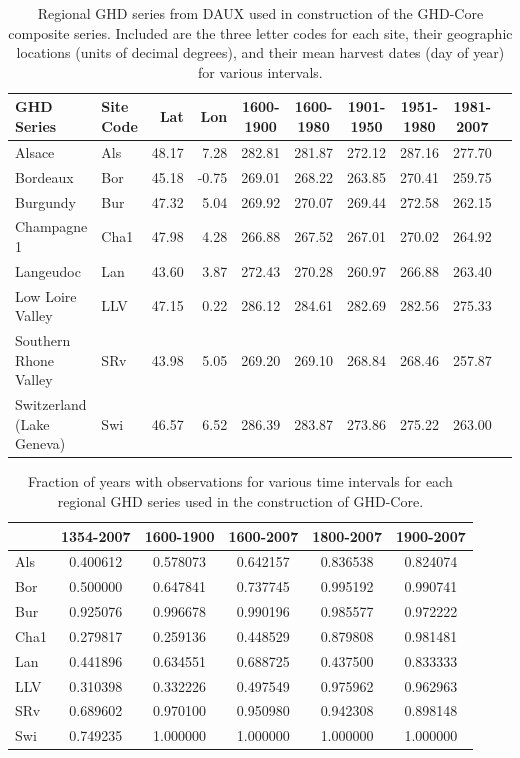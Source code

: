 \documentclass[12pt]{article}
\begin{document}
\begin{table}
\small
\caption{\small Regional GHD series from DAUX used in construction of the GHD-Core composite series. Included are the three letter codes for each site, their geographic locations (units of decimal degrees), and their mean harvest dates (day of year) for various intervals.}
\centering
\begin{tabular}{| l l | r r | c c c c c p{5cm} |}
\hline
 \bf GHD Series & \bf Site Code & \bf Lat & \bf Lon & \bf 1600-1900 & \bf 1600-1980 & \bf 1901-1950 & \bf 1951-1980 & \bf 1981-2007 \\
\hline
Alsace	& Als & 48.17 & 7.28 & 282.81 & 281.87 & 272.12 & 287.16	 & 277.70 \\
Bordeaux	& Bor	& 45.18 & -0.75	& 269.01 & 	268.22	&  263.85 &  270.41 &  259.75\\
Burgundy	& Bur	& 47.32	& 5.04	& 269.92	& 270.07	& 269.44	& 272.58	& 262.15\\
Champagne 1	& Cha1	& 47.98	& 4.28	& 266.88	& 267.52	& 267.01	& 270.02	& 264.92\\
Langeudoc & Lan	& 43.60 & 3.87	& 272.43 &	270.28	& 260.97	& 266.88	& 263.40\\
Low Loire Valley	& LLV	& 47.15	& 0.22	& 286.12	& 284.61	& 282.69	& 282.56	& 275.33\\
Southern Rhone Valley	& SRv	& 43.98	& 5.05	& 269.20	& 269.10	& 268.84	& 268.46	& 257.87\\
Switzerland (Lake Geneva)	& Swi	& 46.57	& 6.52	& 286.39	& 283.87	& 273.86	& 275.22	& 263.00\\
\hline
\end{tabular}
\end{table}

\begin{table}
\small
\caption{\small Fraction of years with observations for various time intervals for each regional GHD series used in the construction of GHD-Core.}
\centering
\begin{tabular}{l c c c c c}
\hline
 & \bf 1354-2007 & \bf 1600-1900 & \bf 1600-2007 & \bf 1800-2007 & \bf 1900-2007\\
\hline
Als	& 0.400612 & 0.578073 & 0.642157 & 0.836538	 & 0.824074\\
Bor	 & 0.500000 & 0.647841 & 0.737745 & 0.995192 & 0.990741\\
Bur & 	0.925076	& 0.996678	& 0.990196	& 0.985577	& 0.972222\\
Cha1	& 0.279817	& 0.259136	& 0.448529	& 0.879808	& 0.981481\\
Lan	& 0.441896	& 0.634551	& 0.688725	& 0.437500	& 0.833333\\
LLV	& 0.310398	& 0.332226	& 0.497549	& 0.975962	& 0.962963\\
SRv	& 0.689602	& 0.970100	& 0.950980	& 0.942308	& 0.898148\\
Swi 	& 0.749235	& 1.000000	& 1.000000	& 1.000000	& 1.000000\\
\hline
\end{tabular}
\end{table}
\end{document}
